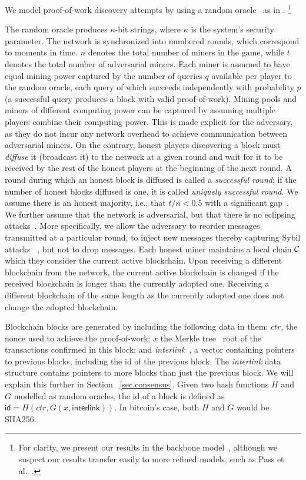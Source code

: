 We model proof-of-work discovery attempts by using a random oracle~\cite{RO} as
in \cite{backbone}.%
\footnote{For clarity, we present our results in the backbone model~\cite{backbone}, although we suspect our results transfer easily to more refined models, such as Pass et al.~\cite{PSS}.}%

The random oracle produces $\kappa$-bit strings, where
$\kappa$ is the system's security parameter. The network is synchronized into
numbered rounds, which correspond to moments in time. $n$ denotes the total
number of miners in the game, while $t$ denotes the total number of adversarial
miners. Each miner is assumed to have equal mining power captured by the number
of queries $q$ available per player to the random oracle, each query of which
succeeds independently with probability $p$ (a successful query produces a block
with valid proof-of-work). Mining pools and miners of different computing power
can be captured by assuming multiple players combine their computing power. This
is made explicit for the adversary, as they do not incur any network overhead to
achieve communication between adversarial miners. On the contrary, honest
players discovering a block must \textit{diffuse} it (broadcast it) to the
network at a given round and wait for it to be received by the rest of the
honest players at the beginning of the next round. A round during which an
honest block is diffused is called a \textit{successful round}; if the number of
honest blocks diffused is one, it is called \textit{uniquely successful round}.
We assume there is an honest majority, i.e., that $t / n < 0.5$ with a
significant gap~\cite{backbone}. We further assume that the network is
adversarial, but that there is no eclipsing attacks~\cite{heilman2015eclipse}. More
specifically, we allow the adversary to reorder messages transmitted at a
particular round, to inject new messages thereby capturing Sybil attacks~
\cite{sybil}, but not to drop messages. Each honest miner maintains a local
chain $\mathcal{C}$ which they consider the current active blockchain. Upon receiving
a different blockchain from the network, the current active blockchain is
changed if the received blockchain is longer than the currently adopted one.
Receiving a different blockchain of the same length as the currently adopted one
does not change the adopted blockchain.

Blockchain blocks are generated by including the following data in them: $ctr$,
the nonce used to achieve the proof-of-work; $x$ the Merkle tree~\cite{merkle} root of the
transactions confirmed in this block; and \textit{interlink}~\cite{KLS}, a
vector containing pointers to previous blocks, including the id of the previous
block. The \textit{interlink} data structure contains pointers to more blocks
than just the previous block. We will explain this further in Section~
\ref{sec.consensus}. Given two hash functions $H$ and $G$ modelled as random
oracles, the id of a block is defined as $\textsf{id} = H(ctr, G(x,
\textsf{interlink}))$. In bitcoin's case, both $H$ and $G$ would be SHA256.

